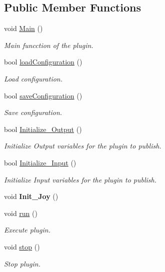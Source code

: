 \subsection*{Public Member Functions}
\begin{DoxyCompactItemize}
\item 
void \hyperlink{class_tuio___client_a13aed5267c36dd0bc9b4dcf6939194d5}{Main} ()
\begin{DoxyCompactList}\small\item\em Main funcction of the plugin. \end{DoxyCompactList}\item 
bool \hyperlink{class_tuio___client_aef7de42628eef1f5c0fb3ff83b26de8b}{load\+Configuration} ()
\begin{DoxyCompactList}\small\item\em Load configuration. \end{DoxyCompactList}\item 
bool \hyperlink{class_tuio___client_a56700c6b7cf9447fde0e3828e90cd55f}{save\+Configuration} ()
\begin{DoxyCompactList}\small\item\em Save configuration. \end{DoxyCompactList}\item 
bool \hyperlink{class_tuio___client_a170015752bb0bb4c7815a08150a42620}{Initialize\+\_\+\+Output} ()
\begin{DoxyCompactList}\small\item\em Initialize Output variables for the plugin to publish. \end{DoxyCompactList}\item 
bool \hyperlink{class_tuio___client_a66bd1d9dc23405e7589d899ef6c5d892}{Initialize\+\_\+\+Input} ()
\begin{DoxyCompactList}\small\item\em Initialize Input variables for the plugin to publish. \end{DoxyCompactList}\item 
\mbox{\label{class_tuio___client_a977ef88120a27438054a2638fb76af3c}} 
void {\bfseries Init\+\_\+\+Joy} ()
\item 
void \hyperlink{class_tuio___client_ae326548bc87892e62dbe5f0a5a8b27cc}{run} ()
\begin{DoxyCompactList}\small\item\em Execute plugin. \end{DoxyCompactList}\item 
void \hyperlink{class_tuio___client_a2df126802294be8dc168c409af801779}{stop} ()
\begin{DoxyCompactList}\small\item\em Stop plugin. \end{DoxyCompactList}\end{DoxyCompactItemize}
